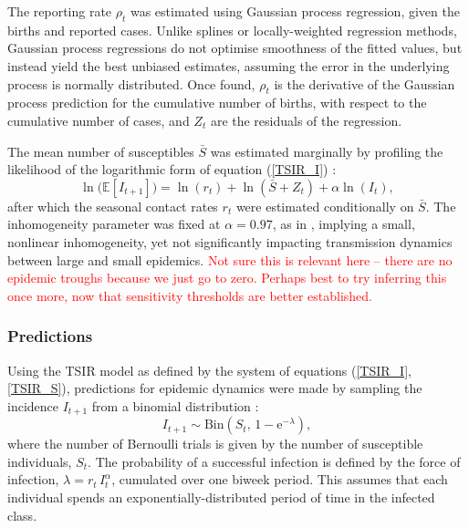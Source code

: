 \documentclass[10pt]{article}
\begin{document}
The reporting rate $\rho_t$ was estimated using Gaussian process regression, given the births and reported cases. Unlike splines or locally-weighted regression methods, Gaussian process regressions do not optimise smoothness of the fitted values, but instead yield the best unbiased estimates, assuming the error in the underlying process is normally distributed. Once found, $\rho_t$ is the derivative of the Gaussian process prediction for the cumulative number of births, with respect to the cumulative number of cases, and $Z_t$ are the residuals of the regression.

The mean number of susceptibles $\bar{S}$ was estimated marginally by profiling the likelihood of the logarithmic form of equation (\ref{TSIR_I}) :
\begin{equation}
\ln\big(\mathbb{E}\left[I_{t+1}\right]\big) = \ln(r_t) + \ln\left(\bar{S} + Z_t\right) + \alpha \ln\left(I_t\right),
\end{equation}
after which the seasonal contact rates $r_t$ were estimated conditionally on $\bar{S}$. The inhomogeneity parameter was fixed at $\alpha = 0.97$, as in \cite{Metcalf2010}, implying a small, nonlinear inhomogeneity, yet not significantly impacting transmission dynamics between large and small epidemics. \textcolor{red}{Not sure this is relevant here -- there are no epidemic troughs because we just go to zero. Perhaps best to try inferring this once more, now that sensitivity thresholds are better established.}






\subsubsection*{Predictions}

Using the TSIR model as defined by the system of equations (\ref{TSIR_I}, \ref{TSIR_S}), predictions for epidemic dynamics were made by sampling the incidence $I_{t+1}$ from a binomial distribution :
\begin{equation}
I_{t+1} \sim \mathrm{Bin}\left(S_t, \, 1-\mathrm{e}^{-\lambda}\right),
\end{equation}
where the number of Bernoulli trials is given by the number of susceptible individuals, $S_t$. The probability of a successful infection is defined by the force of infection, $\lambda = r_t\,I_t^\alpha$, cumulated over one biweek period. This assumes that each individual spends an exponentially-distributed period of time in the infected class.
\end{document}
